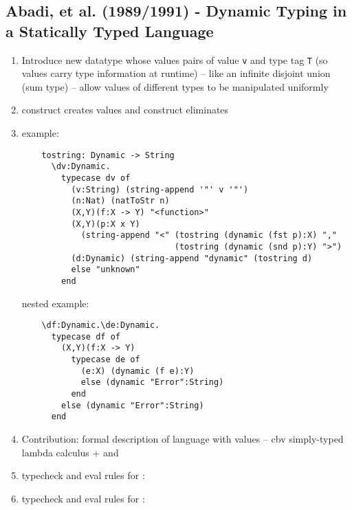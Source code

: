 \documentclass[12pt]{article}	%
\begin{document}
\subsection*{Abadi, et al. (1989/1991) - Dynamic Typing in a Statically Typed Language}
\begin{enumerate}
	\item Introduce new datatype \Dynamic whose values pairs of value \texttt{v} and type tag \texttt{T} (so \Dynamic values carry type information at runtime) -- like an infinite disjoint union (sum type) -- allow values of different types to be manipulated uniformly
	\item {} construct creates \Dynamic values and \typecase construct eliminates
	\item \typecase example:
	\begin{verbatim}
	tostring: Dynamic -> String
	  \dv:Dynamic.
	    typecase dv of
	      (v:String) (string-append '"' v '"')
	      (n:Nat) (natToStr n)
	      (X,Y)(f:X -> Y) "<function>"
	      (X,Y)(p:X x Y)
	        (string-append "<" (tostring (dynamic (fst p):X) ","
	                           (tostring (dynamic (snd p):Y) ">")
	      (d:Dynamic) (string-append "dynamic" (tostring d)
	      else "unknown"
	    end
	\end{verbatim}
	nested \typecase example:
	\begin{verbatim}
	\df:Dynamic.\de:Dynamic.
	  typecase df of
	    (X,Y)(f:X -> Y)
	      typecase de of
	        (e:X) (dynamic (f e):Y)
	        else (dynamic "Error":String)
	      end
	    else (dynamic "Error":String)
	  end
	\end{verbatim}
	\item Contribution: formal description of language with \Dynamic values -- cbv simply-typed lambda calculus + \dynamic and \typecase
	\item typecheck and eval rules for \dynamic:\\
	\item typecheck and eval rules for \typecase:\\

\end{enumerate}
\end{document}
